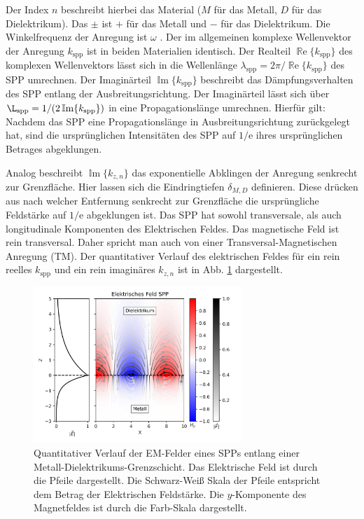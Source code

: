 \documentclass[titlepage]{article}
\renewcommand{\Re}{\operatorname{\mathbb{R}e}}
\begin{document}
	Der Index $n$ beschreibt hierbei das Material ($M$ für das Metall, $D$ für das Dielektrikum). Das $\pm$ ist $+$ für das Metall und  $-$ für das Dielektrikum. Die Winkelfrequenz der Anregung ist $\omega$ . Der im allgemeinen komplexe Wellenvektor der Anregung $k_{\mathrm{spp}}$ ist in beiden Materialien identisch. Der Realteil $\Re\{k_{\mathrm{spp}}\}$ des komplexen Wellenvektors lässt sich in die Wellenlänge $\lambda_{\mathrm{spp}} = 2\pi/ \Re\{k_{\mathrm{spp}}\} $ des SPP umrechnen. Der Imaginärteil $\operatorname{\mathbb{I}m}\{k_{\mathrm{spp}}\}$ beschreibt das Dämpfungsverhalten des SPP entlang der Ausbreitungsrichtung. Der Imaginärteil lässt sich über $\L_{\mathrm{spp}} = 1/(2\operatorname{\mathbb{I}m}\{k_{\mathrm{spp}}\})$ in eine Propagationslänge umrechnen.  Hierfür gilt: Nachdem das SPP eine Propagationslänge in Ausbreitungsrichtung zurückgelegt hat, sind die ursprünglichen Intensitäten des SPP auf $1/\mathrm{e}$ ihres ursprünglichen Betrages abgeklungen.
	
	Analog beschreibt $\operatorname{\mathbb{I}m}\{k_{z, n}\}$ das exponentielle Abklingen der Anregung senkrecht zur Grenzfläche. Hier lassen sich die Eindringtiefen $\delta_{M,D}$ definieren. Diese drücken aus nach welcher Entfernung senkrecht zur Grenzfläche die ursprüngliche Feldstärke auf $1/\mathrm{e}$ abgeklungen ist. Das SPP hat sowohl transversale, als auch longitudinale Komponenten des Elektrischen Feldes. Das magnetische Feld ist rein transversal. Daher spricht man auch von einer Transversal-Magnetischen Anregung (TM).
	Der quantitativer Verlauf des elektrischen Feldes für ein rein reelles $k_{\mathrm{spp}}$ und ein rein imaginäres $k_{z, n}$ ist in Abb. \ref{fig:electric_field_spp} dargestellt.
	\begin{figure}[htbp] 
		\centering
		\includegraphics[width=0.7\textwidth]{figures/E_Feld_SPP.png}
		\caption{Quantitativer Verlauf der EM-Felder eines SPPs entlang einer Metall-Dielektrikums-Grenzschicht. Das Elektrische Feld ist durch die Pfeile dargestellt. Die Schwarz-Weiß Skala der Pfeile entspricht dem Betrag der Elektrischen Feldstärke. Die $y$-Komponente des Magnetfeldes ist durch die Farb-Skala dargestellt.}
		\label{fig:electric_field_spp}
	\end{figure}
\end{document}
